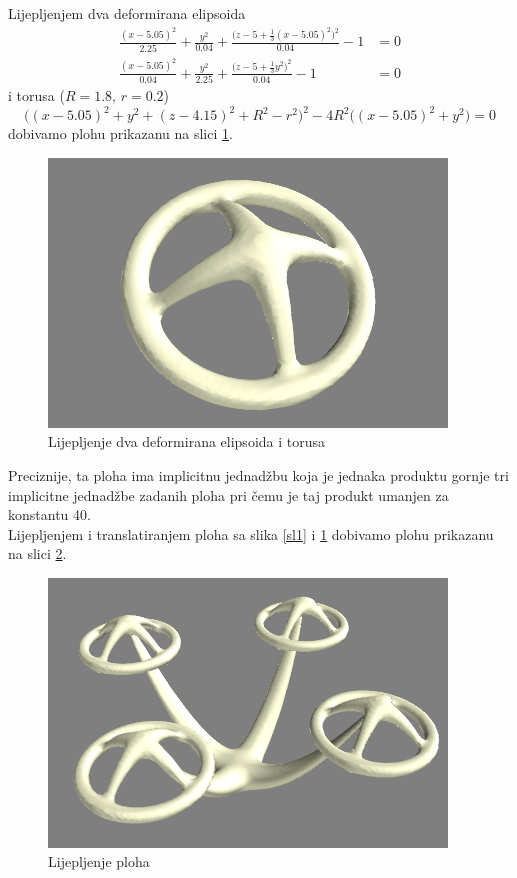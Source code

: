 \documentclass[a4paper,12pt]{article}
\theoremstyle{zad}
\begin{document}
\noindent Lijepljenjem dva deformirana elipsoida
\begin{align}
\frac{(x-5.05)^2}{2.25}+\frac{y^2}{0.04}+\frac{\big(z-5+\frac{1}{3}(x-5.05)^2\big)^2}{0.04}-1&=0\label{jed1}\\[5pt]
\frac{(x-5.05)^2}{0.04}+\frac{y^2}{2.25}+\frac{\big(z-5+\frac{1}{3}y^2\big)^2}{0.04}-1&=0\label{jed2}
\end{align}
i torusa ($R=1.8,\,r=0.2$)
\begin{equation}
\big((x-5.05)^2+y^2+(z-4.15)^2+R^2-r^2\big)^2-4R^2\big((x-5.05)^2+y^2\big)=0\label{jed3}
\end{equation}
dobivamo plohu prikazanu na slici \ref{sl2}.\par
\begin{figure}[!ht]
\centering
\includegraphics[scale=0.3]{cand2.png}
\vspace*{-5pt}
\caption{Lijepljenje dva deformirana elipsoida i torusa}\label{sl2}
\end{figure}
\noindent Preciznije, ta ploha ima implicitnu jednadžbu koja je jednaka produktu gornje tri implicitne jednadžbe zadanih ploha pri čemu je taj produkt umanjen za konstantu $40$.\\[8pt]
Lijepljenjem i translatiranjem ploha sa slika \ref{sl1} i \ref{sl2} dobivamo plohu prikazanu na slici \ref{sl3}.
\begin{figure}[!ht]
\centering
\includegraphics[scale=0.35]{cand3.png}
\vspace*{-5pt}
\caption{Lijepljenje ploha}\label{sl3}
\end{figure}
\end{document}
